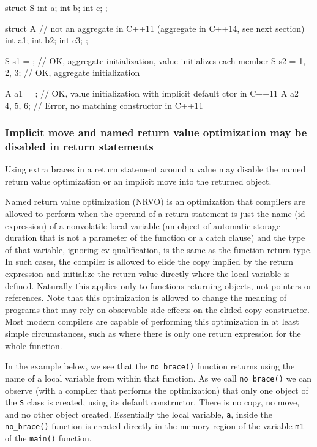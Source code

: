 \begin{emcppslisting}
struct S
{
    int a;
    int b;
    int c;
};

struct A  // not an aggregate in C++11 (aggregate in C++14, see next section)
{
    int a{1};
    int b{2};
    int c{3};
};

S s1 = {};         // OK, aggregate initialization, value initializes each member
S s2 = {1, 2, 3};  // OK, aggregate initialization

A a1 = {};         // OK, value initialization with implicit default ctor in C++11
A a2 = {4, 5, 6};  // Error, no matching constructor in C++11
\end{emcppslisting}


\subsubsection[Implicit move and named return value optimization may be disabled in \lstinline!return! statements]{Implicit move and named return value optimization may be disabled in {\SubsubsecCode return} statements}\label{implicit-move-and-named-return-value-optimization-may-be-disabled-in-return-statements}

Using extra braces in a return statement around a value may disable the
named return value optimization or an implicit move into the returned
object.

Named return value optimization (NRVO) is an optimization that compilers
are allowed to perform when the operand of a return statement is just
the name (id-expression) of a nonvolatile local variable (an object of
automatic storage duration that is not a parameter of the function or a
catch clause) and the type of that variable, ignoring cv-qualification,
is the same as the function return type. In such cases, the compiler is
allowed to elide the copy implied by the return expression and
initialize the return value directly where the local variable is
defined. Naturally this applies only to functions returning objects, not
pointers or references. Note that this optimization is allowed to change
the meaning of programs that may rely on observable side effects on the
elided copy constructor. Most modern compilers are capable of performing
this optimization in at least simple circumstances, such as where there
is only one return expression for the whole function.

In the example below, we see that the \lstinline!no_brace()! function
returns using the name of a local variable from within that function. As
we call \lstinline!no_brace()! we can observe (with a compiler that
performs the optimization) that only one object of the \lstinline!S! class
is created, using its default constructor. There is no copy, no move,
and no other object created. Essentially the local variable, \lstinline!a!,
inside the \lstinline!no_brace()! function is created directly in the
memory region of the variable \lstinline!m1! of the \lstinline!main()!
function.

